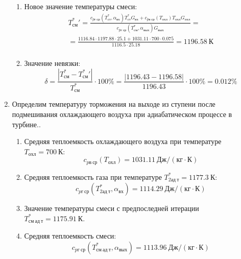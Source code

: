 \documentclass[a4paper,10pt]{article}
\begin{document}
\begin{enumerate}
\begin{enumerate}
            \item Новое значение температуры смеси:
            \begin{gather*}
                T_{см}^*\prime = \frac{
                        c_{pг\ ср} (T_{ст}^*, \alpha_{вх}) T_{ст}^* G_{вх} + c_{pв\ ср} (T_{охл}) T_{охл} G_{охл}
                    }{
                        c_{pг\ ср} (T_{см}^{*}, \alpha_{вых}) G_{вых}
                    } =\\
                = \frac{
                    1116.84
                    \cdot 1197.88 \cdot 25.1 +
                    1031.11
                    \cdot 700 \cdot 0.075
                }{
                    1116.5
                    \cdot  25.18
                } =
                1196.58\ К\\
            \end{gather*}

            \item Значение невязки:
            \[
                \delta = \frac{ \left| T_{см}^{*} - T_{см}^*\prime \right| }{T_{см}^{*}} \cdot 100 \% =
                    \frac{
                        \left| 1196.43 - 1196.58 \right|
                    }{
                        1196.43
                    } \cdot 100 \% =
                0.012 \%
            \]
        \end{enumerate}


        \item Определим температуру торможения на выходе из ступени после подмешивания охлаждающего воздуха при адиабатическом процессе в турбине..
        \begin{enumerate}

            \item Средняя теплоемкость охлаждающего воздуха при температуре $T_{охл} = 700\ К $:
            \[
                c_{pв\ ср} (T_{охл}) = 1031.11\ Дж/ (кг \cdot К)
            \]

            \item Средняя теплоемкость газа при температуре $T_{2ад\ т}^* = 1177.3 \ К $:
            \[
                c_{pг\ ср} (T_{2ад\ т}^*, \alpha_{вх}) =
                1114.29\ Дж/ (кг \cdot К)
            \]

            \item Значение температуры смеси с предпоследней итерации $T_{см\ ад\ т}^{*} = 1175.91\ К$.

            \item Средняя теплоемкость смеси:
            \[
                c_{pг\ ср} (T_{см\ ад\ т}^{*}, \alpha_{вых}) =
                1113.96\ Дж/ (кг \cdot К)
            \]


\end{enumerate}
\end{enumerate}
\end{document}
